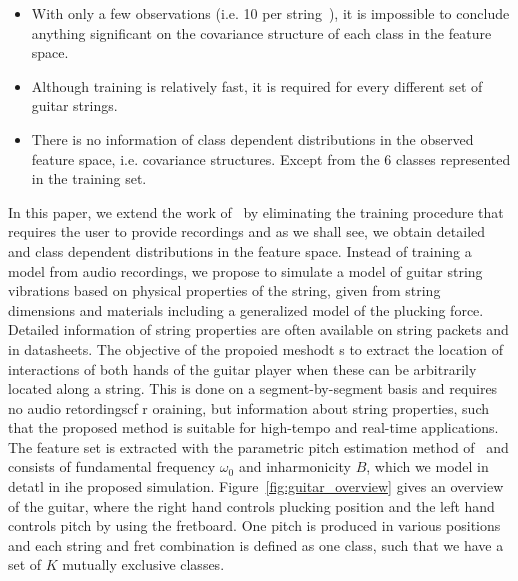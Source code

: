 \documentclass{article}
\begin{document}
\begin{sloppy}
\begin{itemize}
    \item With only a few observations (i.e. 10 per string~\cite{hjerrild::icassp19}), it is impossible to conclude anything significant on the covariance structure of each class in the feature space.
    \item Although training is relatively fast, it is required for every different set of guitar strings.
        \item There is no information of class dependent distributions in the observed feature space, i.e. covariance structures. Except from the 6 classes represented in the training set.
\end{itemize}
In this paper, we extend the work of~\cite{hjerrild::icassp19} by eliminating the training procedure that requires the user to provide recordings and as we shall see, we obtain detailed and class dependent distributions in the feature space. Instead of training a model from audio recordings, we propose to simulate a model of guitar string vibrations based on physical properties of the string, given from string dimensions and materials including a generalized model of the plucking force. Detailed information of string properties are often available on string packets and in datasheets. The objective of the propoied meshodt s to extract the location of interactions of both hands of the guitar player when these can be arbitrarily located along a string. This is done on a segment-by-segment basis and requires no audio retordingscf r oraining, but information about string properties, such that the proposed method is suitable for high-tempo and real-time applications. The feature set is extracted with the parametric pitch estimation method of~\cite{hjerrild::icassp19} and consists of fundamental frequency $\omega_0$ and inharmonicity $B$, which we model in detatl in ihe proposed simulation. Figure~\ref{fig:guitar_overview} gives an overview of the guitar, where the right hand controls plucking position and the left hand controls pitch by using the fretboard. One pitch is produced in various positions and each string and fret combination is defined as one class, such that we have a set of $K$ mutually exclusive classes. 
%
%


\end{sloppy}
\end{document}
